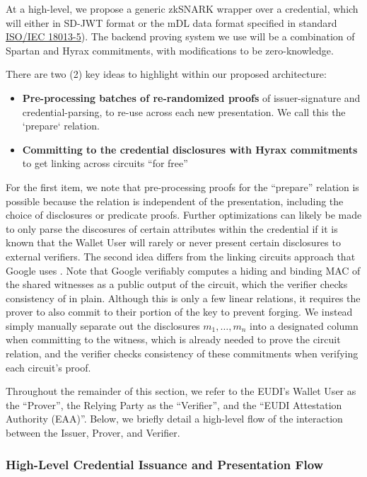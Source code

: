 At a high-level, we propose a generic zkSNARK wrapper over a credential, which will either in SD-JWT format or the mDL data format specified in standard \href{https://mobiledl-e5018.web.app/ISO_18013-5_E_draft.pdf}{ISO/IEC 18013-5}). The backend proving system we use will be a combination of Spartan and Hyrax commitments, with modifications to be zero-knowledge. 

There are two (2) key ideas to highlight within our proposed architecture:

\begin{itemize}
    \item \textbf{Pre-processing batches of re-randomized proofs} of issuer-signature and credential-parsing, to re-use across each new presentation. We call this the `prepare` relation.
    \item \textbf{Committing to the credential disclosures with Hyrax commitments} \cite{cryptoeprint:2017/1132} to get linking across circuits ``for free''
\end{itemize}

For the first item, we note that pre-processing proofs for the ``prepare'' relation is possible because the relation is independent of the presentation, including the choice of disclosures or predicate proofs. Further optimizations can likely be made to only parse the discosures of certain attributes within the credential if it is known that the Wallet User will rarely or never present certain disclosures to external verifiers.
The second idea differs from the linking circuits approach that Google uses \cite{cryptoeprint:2024/2010}. Note that Google verifiably computes a hiding and binding MAC of the shared witnesses as a public output of the circuit, which the verifier checks consistency of in plain. Although this is only a few linear relations, it requires the prover to also commit to their portion of the key to prevent forging. We instead simply manually separate out the disclosures $m_1, \dots, m_n$ into a designated column when committing to the witness, which is already needed to prove the circuit relation, and the verifier checks consistency of these commitments when verifying each circuit's proof.

Throughout the remainder of this section, we refer to the EUDI's Wallet User as the ``Prover'', the Relying Party as the ``Verifier'', and the ``EUDI Attestation Authority (EAA)''. Below, we briefly detail a high-level flow of the interaction between the Issuer, Prover, and Verifier.

\subsubsection{High-Level Credential Issuance and Presentation Flow}\label{sec:high-level-flow}

